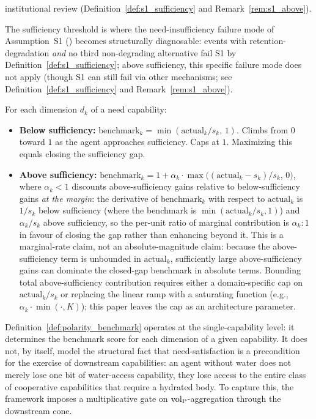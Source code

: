 \begin{definition}
\begin{itemize}
  institutional review (Definition~\ref{def:s1_sufficiency}
  and Remark~\ref{rem:s1_above}).
\end{itemize}
The sufficiency threshold is where the need-insufficiency
failure mode of Assumption~S1
(\citep[Revealed~Sacrifice]{lasser2026paper8a}) becomes structurally
diagnosable: events with retention-degradation \emph{and} no
third non-degrading alternative fail S1 by
Definition~\ref{def:s1_sufficiency}; above sufficiency, this
specific failure mode does not apply (though S1 can still fail
via other mechanisms; see
Definition~\ref{def:s1_sufficiency} and
Remark~\ref{rem:s1_above}).
\end{definition}

\begin{definition}
\label{def:polarity_benchmark}
For each dimension $d_k$ of a need capability:
\begin{itemize}
\item \textbf{Below sufficiency:}
  $\mathrm{benchmark}_k = \min(\mathrm{actual}_k / s_k,\, 1)$.
  Climbs from $0$ toward $1$ as the agent approaches sufficiency.
  Caps at $1$.  Maximizing this equals closing the sufficiency
  gap.
\item \textbf{Above sufficiency:}
  $\mathrm{benchmark}_k = 1 + \alpha_k \cdot
  \max\!\bigl((\mathrm{actual}_k - s_k)/s_k,\, 0\bigr)$,
  where $\alpha_k < 1$ discounts above-sufficiency gains relative
  to below-sufficiency gains \emph{at the margin}: the
  derivative of $\mathrm{benchmark}_k$ with respect to
  $\mathrm{actual}_k$ is $1/s_k$ below sufficiency (where the
  benchmark is $\min(\mathrm{actual}_k/s_k, 1)$) and
  $\alpha_k/s_k$ above sufficiency, so the per-unit ratio of
  marginal contribution is $\alpha_k:1$ in favour of closing
  the gap rather than enhancing beyond it.  This is a
  marginal-rate claim, not an absolute-magnitude claim: because
  the above-sufficiency term is unbounded in
  $\mathrm{actual}_k$, sufficiently large above-sufficiency
  gains can dominate the closed-gap benchmark in absolute
  terms.  Bounding total above-sufficiency contribution
  requires either a domain-specific cap on
  $\mathrm{actual}_k/s_k$ or replacing the linear ramp with a
  saturating function (e.g., $\alpha_k \cdot \min(\cdot, K)$);
  this paper leaves the cap as an architecture parameter.
\end{itemize}
\end{definition}

Definition~\ref{def:polarity_benchmark} operates at the
single-capability level: it determines the benchmark score for
each dimension of a given capability.  It does not, by itself,
model the structural fact that need-satisfaction is a precondition
for the exercise of downstream capabilities: an agent without
water does not merely lose one bit of water-access capability,
they lose access to the entire class of cooperative capabilities
that require a hydrated body.  To capture this, the framework
imposes a multiplicative gate on ${\operatorname{vol}_{\mathrm{P}}}$-aggregation through the
downstream cone.

